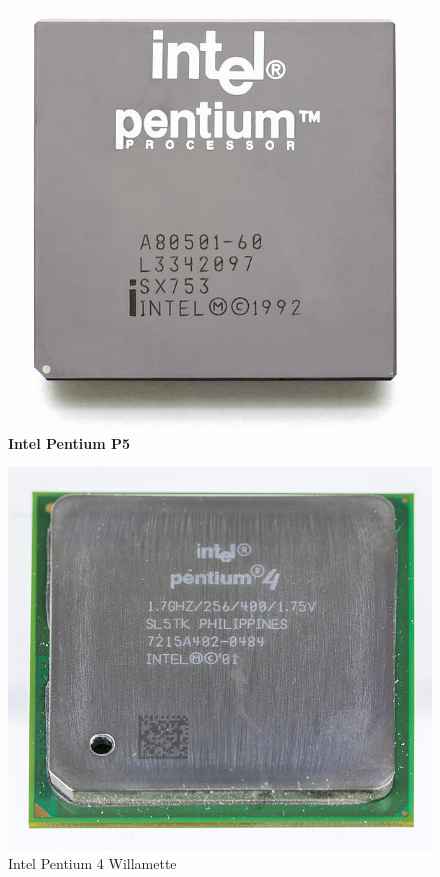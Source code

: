 \begin{figure}[htb]
	\centering
	\includegraphics[scale = 0.15]{Graphics/Intel_Pentium_P5.jpg}
	\caption{\textbf{Intel Pentium P5}}
	\label{fig:22}
\end{figure}

\begin{figure}[htb]
	\centering
	\includegraphics[scale = 0.15]{Graphics/Pentium_4_-_SL5TK-3056.jpg}
	\caption{Intel Pentium 4 Willamette}
	\label{fig:23}
\end{figure}

